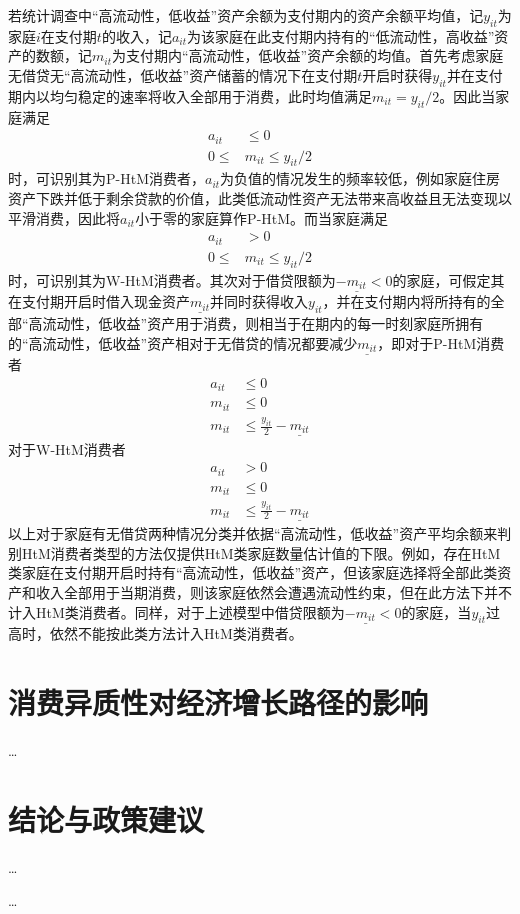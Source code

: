 \documentclass[supercite]{HustGraduPaper}
\begin{document}
    若统计调查中“高流动性，低收益”资产余额为支付期内的资产余额平均值，记$y_{it}$为家庭$i$在支付期$t$的收入，记$a_{it}$为该家庭在此支付期内持有的“低流动性，高收益”资产的数额，记$m_{it}$为支付期内“高流动性，低收益”资产余额的均值。首先考虑家庭无借贷无“高流动性，低收益”资产储蓄的情况下在支付期$t$开启时获得$y_{it}$并在支付期内以均匀稳定的速率将收入全部用于消费，此时均值满足$m_{it}=y_{it}/2$。因此当家庭满足
    \begin{equation}
    \begin{aligned}
    a_{it} & \leq 0\\
    0 \leq & m_{it} \leq y_{it}/2
    \end{aligned}
    \end{equation}
    时，可识别其为P-HtM消费者，$a_{it}$为负值的情况发生的频率较低，例如家庭住房资产下跌并低于剩余贷款的价值，此类低流动性资产无法带来高收益且无法变现以平滑消费，因此将$a_{it}$小于零的家庭算作P-HtM。而当家庭满足
    \begin{equation}
    \begin{aligned}
    a_{it} & > 0\\
    0 \leq & m_{it} \leq y_{it}/2
    \end{aligned}
    \end{equation}
    时，可识别其为W-HtM消费者。其次对于借贷限额为$-\underline{m_{it}}<0$的家庭，可假定其在支付期开启时借入现金资产$\underline{m_{it}}$并同时获得收入$y_{it}$，并在支付期内将所持有的全部“高流动性，低收益”资产用于消费，则相当于在期内的每一时刻家庭所拥有的“高流动性，低收益”资产相对于无借贷的情况都要减少$\underline{m_{it}}$，即对于P-HtM消费者
    \begin{equation}
    \begin{aligned}
    a_{it} & \leq 0\\
    m_{it} & \leq 0\\
    m_{it} & \leq \frac{y_{it}}{2} - \underline{m_{it}}
    \end{aligned}
    \end{equation}
    对于W-HtM消费者
    \begin{equation}
    \begin{aligned}
    a_{it} & > 0\\
    m_{it} & \leq 0\\
    m_{it} & \leq \frac{y_{it}}{2} - \underline{m_{it}}
    \end{aligned}
    \end{equation}
    以上对于家庭有无借贷两种情况分类并依据“高流动性，低收益”资产平均余额来判别HtM消费者类型的方法仅提供HtM类家庭数量估计值的下限。例如，存在HtM类家庭在支付期开启时持有“高流动性，低收益”资产，但该家庭选择将全部此类资产和收入全部用于当期消费，则该家庭依然会遭遇流动性约束，但在此方法下并不计入HtM类消费者。同样，对于上述模型中借贷限额为$-\underline{m_{it}}<0$的家庭，当$y_{it}$过高时，依然不能按此类方法计入HtM类消费者。

    \section{消费异质性对经济增长路径的影响}
    \ldots
    
    \section{结论与政策建议}
    \ldots
    
    \begin{thankpage}
    \ldots
    \end{thankpage}

    
    
\end{document}
